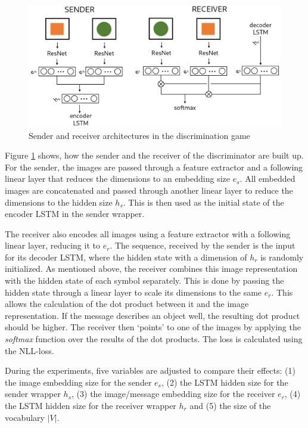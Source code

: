 \begin{figure}[h]
    \centering
    \includegraphics[width=.8\linewidth]{figures/arch_discriminator.png}
    \caption{Sender and receiver architectures in the discrimination game}
    \label{fig:discriminator_architecture}
\end{figure}

Figure \ref{fig:discriminator_architecture} shows, how the sender and the receiver of the discriminator are built up.
For the sender, the images are passed through a feature extractor and a following linear layer that reduces the dimensions to an embedding size $e_s$.
All embedded images are concatenated and passed through another linear layer to reduce the dimensions to the hidden size $h_s$.
This is then used as the initial state of the encoder LSTM in the sender wrapper.

The receiver also encodes all images using a feature extractor with a following linear layer, reducing it to $e_r$.
The sequence, received by the sender is the input for its decoder LSTM, where the hidden state with a dimension of $h_r$ is randomly initialized.
As mentioned above, the receiver combines this image representation with the hidden state of each symbol separately.
This is done by passing the hidden state through a linear layer to scale its dimensions to the same $e_r$.
This allows the calculation of the dot product between it and the image representation.
If the message describes an object well, the resulting dot product should be higher.
The receiver then `points' to one of the images by applying the \emph{softmax} function over the results of the dot products.
The loss is calculated using the NLL-loss.

During the experiments, five variables are adjusted to compare their effects:
(1) the image embedding size for the sender $e_s$, (2) the LSTM hidden size for the sender wrapper $h_s$, (3) the image/message embedding size for the receiver $e_r$, (4) the LSTM hidden size for the receiver wrapper $h_r$ and (5) the size of the vocabulary $|V|$.

